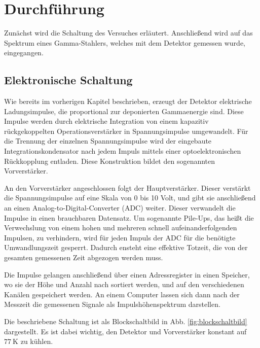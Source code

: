\section{Durchführung}
\label{sec:Durchführung}

    Zunächst wird die Schaltung des Versuches erläutert. Anschließend wird auf das
    Spektrum eines Gamma-Stahlers, welches mit dem Detektor gemessen wurde, eingegangen.

    \subsection{Elektronische Schaltung}

    Wie bereits im vorherigen Kapitel beschrieben, erzeugt der Detektor elektrische
    Ladungsimpulse, die proportional zur deponierten Gammaenergie sind. Diese Impulse werden durch
    elektrische Integration von einem kapazitiv rückgekoppelten Operationsverstärker
    in Spannungsimpulse umgewandelt. Für die Trennung der einzelnen Spannungsimpulse wird
    der eingebaute Integrationskondensator nach jedem Impuls mittels einer optoelektronischen
    Rückkopplung entladen. Diese Konstruktion bildet den sogenannten Vorverstärker.

    An den Vorverstärker angeschlossen folgt der Hauptverstärker.
    Dieser verstärkt die Spannungsimpulse auf eine Skala von 0 bis 10 Volt, und
    gibt sie anschließend an einen Analog-to-Digital-Converter (ADC) weiter.
    Dieser verwandelt die Impulse in einen brauchbaren Datensatz. Um sogenannte Pile-Ups, das
    heißt die Verwechslung von einem hohen und mehreren schnell aufeinanderfolgenden Impulsen,
    zu verhindern, wird für jeden Impuls der ADC für die benötigte Umwandlungszeit gesperrt. Dadurch
    ensteht eine effektive Totzeit, die von der gesamten gemessenen Zeit abgezogen werden muss.

    Die Impulse gelangen anschließend über einen Adressregister in einen Speicher, wo
    sie der Höhe und Anzahl nach sortiert werden, und auf den verschiedenen Kanälen
    gespeichert werden. An einem Computer lassen sich dann nach der Messzeit die gemessenen
    Signale als Impulshöhenspektrum darstellen.

    Die beschriebene Schaltung ist als Blockschaltbild in Abb. \ref{fig:blockschaltbild}
    dargestellt. Es ist dabei wichtig, den Detektor und Vorverstärker konstant auf $\SI{77}{\kelvin}$
    zu kühlen.

